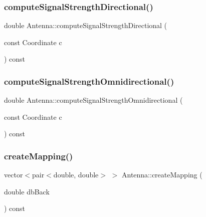 \subsubsection{\texorpdfstring{compute\+Signal\+Strength\+Directional()}{computeSignalStrengthDirectional()}}
{\footnotesize\ttfamily double Antenna\+::compute\+Signal\+Strength\+Directional (\begin{DoxyParamCaption}\item[{const Coordinate}]{c }\end{DoxyParamCaption}) const\hspace{0.3cm}{\ttfamily [private]}}

\mbox{\label{class_antenna_a26077f4061413733cedf9253ecc8686f}} 
\subsubsection{\texorpdfstring{compute\+Signal\+Strength\+Omnidirectional()}{computeSignalStrengthOmnidirectional()}}
{\footnotesize\ttfamily double Antenna\+::compute\+Signal\+Strength\+Omnidirectional (\begin{DoxyParamCaption}\item[{const Coordinate}]{c }\end{DoxyParamCaption}) const\hspace{0.3cm}{\ttfamily [private]}}

\mbox{\label{class_antenna_afe86e36673d4b28713f983cc63d89e1b}} 
\subsubsection{\texorpdfstring{create\+Mapping()}{createMapping()}}
{\footnotesize\ttfamily vector$<$pair$<$double, double$>$ $>$ Antenna\+::create\+Mapping (\begin{DoxyParamCaption}\item[{double}]{db\+Back }\end{DoxyParamCaption}) const\hspace{0.3cm}{\ttfamily [private]}}

\mbox{\label{class_antenna_a983a0784315567c2ab6ac1820cf558c5}} 
